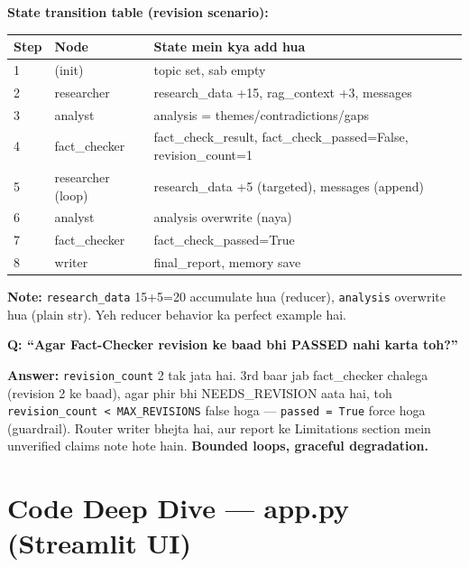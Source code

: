 \documentclass[11pt, a4paper]{article}
\begin{document}
\begin{conceptbox}
\textbf{State transition table (revision scenario):}

\begin{longtable}{p{2.6cm} p{2.8cm} p{7cm}}
\toprule
\textbf{Step} & \textbf{Node} & \textbf{State mein kya add hua} \\
\midrule
1 & (init) & topic set, sab empty \\
2 & researcher & research\_data +15, rag\_context +3, messages \\
3 & analyst & analysis = themes/contradictions/gaps \\
4 & fact\_checker & fact\_check\_result, fact\_check\_passed=False, revision\_count=1 \\
5 & researcher (loop) & research\_data +5 (targeted), messages (append) \\
6 & analyst & analysis overwrite (naya) \\
7 & fact\_checker & fact\_check\_passed=True \\
8 & writer & final\_report, memory save \\
\bottomrule
\end{longtable}

\textbf{Note:} \texttt{research\_data} 15+5=20 accumulate hua (reducer), \texttt{analysis} overwrite hua (plain str). Yeh reducer behavior ka perfect example hai.
\end{conceptbox}

\begin{interviewbox}
\textbf{Q: ``Agar Fact-Checker revision ke baad bhi PASSED nahi karta toh?''}

\textbf{Answer:} \texttt{revision\_count} 2 tak jata hai. 3rd baar jab fact\_checker chalega (revision 2 ke baad), agar phir bhi NEEDS\_REVISION aata hai, toh \texttt{revision\_count < MAX\_REVISIONS} false hoga --- \texttt{passed = True} force hoga (guardrail). Router writer bhejta hai, aur report ke Limitations section mein unverified claims note hote hain. \textbf{Bounded loops, graceful degradation.}
\end{interviewbox}

\section{Code Deep Dive --- app.py (Streamlit UI)}
\end{document}
